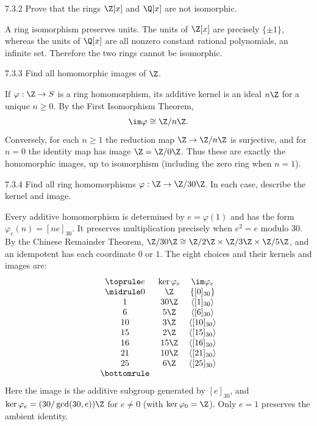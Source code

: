 \documentclass[11pt,oneside]{article}
\begin{document}
\begin{exercise}{7.3.2}
Prove that the rings $\Z[x]$ and $\Q[x]$ are not isomorphic.
\end{exercise}
\begin{solution}
A ring isomorphism preserves units. The units of $\Z[x]$ are precisely $\{\pm1\}$, whereas the units of $\Q[x]$ are all nonzero constant rational polynomials, an infinite set. Therefore the two rings cannot be isomorphic.
\end{solution}

\begin{exercise}{7.3.3}
Find all homomorphic images of $\Z$.
\end{exercise}
\begin{solution}
If $\varphi:\Z\to S$ is a ring homomorphism, its additive kernel is an ideal $n\Z$ for a unique $n\ge0$. By the First Isomorphism Theorem,
\[
\im\varphi\cong\Z/n\Z.
\]
Conversely, for each $n\ge1$ the reduction map $\Z\to\Z/n\Z$ is surjective, and for $n=0$ the identity map has image $\Z=\Z/0\Z$. Thus these are exactly the homomorphic images, up to isomorphism (including the zero ring when $n=1$).
\end{solution}

\begin{exercise}{7.3.4}
Find all ring homomorphisms $\varphi:\Z\to\Z/30\Z$. In each case, describe the kernel and image.
\end{exercise}
\begin{solution}
Every additive homomorphism is determined by $e=\varphi(1)$ and has the form $\varphi_e(n)=[ne]_{30}$. It preserves multiplication precisely when $e^2=e$ modulo $30$. By the Chinese Remainder Theorem, $\Z/30\Z\cong\Z/2\Z\times\Z/3\Z\times\Z/5\Z$, and an idempotent has each coordinate $0$ or $1$. The eight choices and their kernels and images are:
\[
\begin{array}{@{}c c c@{}}
\toprule
 e & \ker\varphi_e & \im\varphi_e\\
\midrule
0&\Z&\{[0]_{30}\}\\
1&30\Z&\langle[1]_{30}\rangle\\
6&5\Z&\langle[6]_{30}\rangle\\
10&3\Z&\langle[10]_{30}\rangle\\
15&2\Z&\langle[15]_{30}\rangle\\
16&15\Z&\langle[16]_{30}\rangle\\
21&10\Z&\langle[21]_{30}\rangle\\
25&6\Z&\langle[25]_{30}\rangle\\
\bottomrule
\end{array}
\]
Here the image is the additive subgroup generated by $[e]_{30}$, and $\ker\varphi_e=(30/\gcd(30,e))\Z$ for $e\ne0$ (with $\ker\varphi_0=\Z$). Only $e=1$ preserves the ambient identity.
\end{solution}
\end{document}
